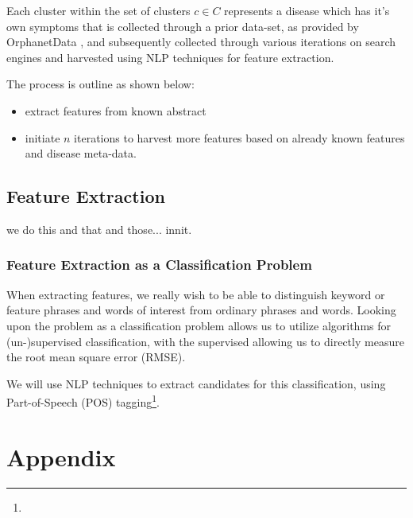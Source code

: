 \documentclass[10pt,letterpaper,final]{article}
\begin{document}
Each cluster within the set of clusters $c \in C$ represents a disease
which has it's own symptoms that is collected through a prior data-set,
as provided by OrphanetData , and subsequently
collected through various iterations on search engines and harvested
using NLP techniques for feature extraction.

The process is outline as shown below:
\begin{itemize}
\item extract features from known abstract
\item initiate $n$ iterations to harvest more features based on already
known features and disease meta-data.
\end{itemize}


\subsection{Feature Extraction}
we do this and that and those... innit.


\subsubsection{Feature Extraction as a Classification Problem}
When extracting features, we really wish to be able to distinguish keyword or
feature phrases and words of interest from ordinary phrases and words. Looking
upon the problem as a classification problem allows us to utilize algorithms for
(un-)supervised classification, with the supervised allowing us to directly
measure the root mean square error (RMSE).

We will use NLP techniques to extract candidates for this classification, using
Part-of-Speech (POS) tagging\footnote{}.




\appendix
\section{Appendix}

\renewcommand\bibname{References}


\end{document}
